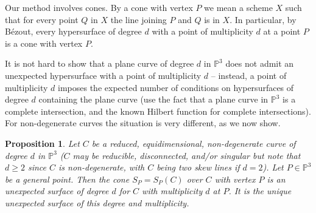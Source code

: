 \documentclass[12pt]{amsart}
\numberwithin{equation}{section}
\newtheorem{proposition}[theorem]{Proposition}
\theoremstyle{definition}
\newcommand{\PP}{ \ensuremath{\mathbb{P}}}
\begin{document}
Our method involves cones.
By a cone with vertex $P$ we mean a scheme $X$ such that for every point $Q$ in $X$ the line joining $P$ and $Q$ is in $X$.
In particular, by B\'ezout, every hypersurface of degree $d$ with a point of multiplicity $d$ at a point $P$ is a cone with vertex $P$.


It is not hard to show that a plane curve of degree $d$ in $\PP^3$ does not admit an unexpected hypersurface with a point of 
multiplicity $d$ -- instead, a point of multiplicity $d$ imposes the expected number of conditions on hypersurfaces of degree $d$ 
containing the plane curve (use the fact that a plane curve in $\PP^3$ is a complete intersection,
and the known Hilbert function for complete intersections). For non-degenerate curves the situation is very different, as we now show.



\begin{proposition} \label{cone in P3}
Let $C$ be a reduced, equidimensional, non-degenerate curve of degree $d$ in $\PP^3$ ($C$ may be reducible, disconnected, and/or singular 
but note that $d \geq 2$ since $C$ is non-degenerate, with $C$ being two skew lines if $d=2$). Let $P \in \PP^3$ be a general point. 
Then the cone $S_P=S_P(C)$ over $C$ with vertex $P$ is an unexpected surface of degree $d$ for $C$ with multiplicity $d$ at $P$. It is the unique unexpected surface of this degree and multiplicity.
\end{proposition}
\end{document}
